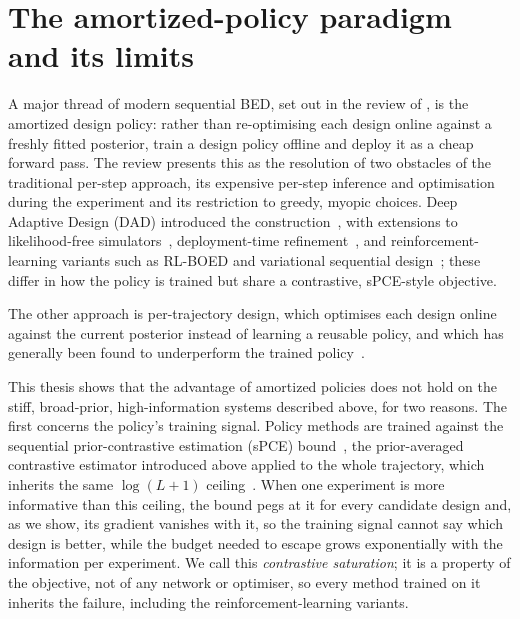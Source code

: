 \section{The amortized-policy paradigm and its limits}
\label{sec:intro-obstacle}

A major thread of modern sequential BED, set out in the review of \citet{rainforth2024modern}, is
the amortized design policy: rather than re-optimising each design online against a freshly fitted
posterior, train a design policy offline and deploy it as a cheap forward pass. The review presents
this as the resolution of two obstacles of the traditional per-step approach, its expensive
per-step inference and optimisation during the experiment and its restriction to greedy, myopic
choices. Deep Adaptive Design (DAD) introduced the construction~\citep{foster2021deep}, with
extensions to likelihood-free simulators~\citep{ivanova2021implicit}, deployment-time
refinement~\citep{hedman2025stepdad}, and reinforcement-learning variants such as RL-BOED and
variational sequential design~\citep{blau2022optimizing,shen2025vsoed}; these differ in how the
policy is trained but share a contrastive, sPCE-style objective.

The other approach is per-trajectory design, which
optimises each design online against the current posterior instead of learning a reusable policy,
and which has generally been found to underperform the trained
policy~\citep{ivanova2021implicit,zaballa2025bridging}.

This thesis shows that the advantage of amortized policies does not hold on the stiff,
broad-prior, high-information systems described above, for two reasons. The first concerns the
policy's training signal. Policy methods are trained against the sequential prior-contrastive
estimation (sPCE) bound~\citep{foster2019variational,foster2020unified,foster2021deep}, the
prior-averaged contrastive estimator introduced above applied to the whole trajectory, which
inherits the same $\log(L+1)$ ceiling~\citep{mcallester2020formal,paninski2005asymptotic}. When one
experiment is more informative than this ceiling, the bound pegs at it for every candidate design
and, as we show, its gradient vanishes with it, so the training signal cannot say which design is
better, while the budget needed to escape grows exponentially with the information per experiment.
We call this \emph{contrastive saturation}; it is a property of the objective, not of any network
or optimiser, so every method trained on it inherits the failure, including the
reinforcement-learning variants.

